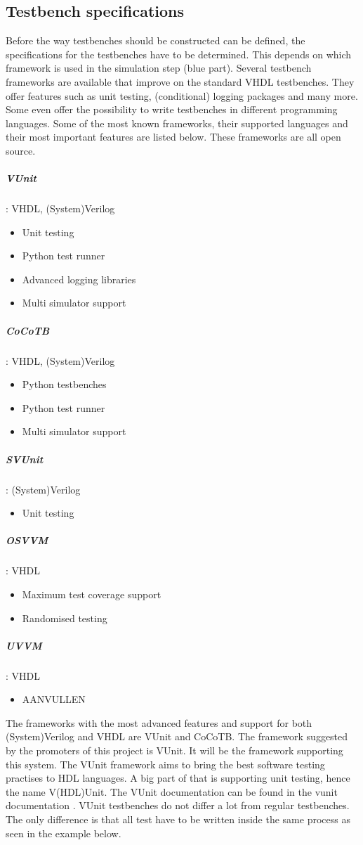 \subsection{Testbench specifications}
Before the way testbenches should be constructed can be defined, the specifications for the testbenches have to be determined. This depends on which framework is used in the simulation step (blue part). Several testbench frameworks are available that improve on the standard VHDL testbenches. They offer features such as unit testing, (conditional) logging packages and many more. Some even offer the possibility to write testbenches in different programming languages.
\npar
Some of the most known frameworks, their supported languages and their most important features are listed below. These frameworks are all open source.
\subparagraph{VUnit}: VHDL, (System)Verilog
\begin{itemize}
	\item Unit testing
	\item Python test runner
	\item Advanced logging libraries
	\item Multi simulator support
\end{itemize}
\subparagraph{CoCoTB}: VHDL, (System)Verilog
\begin{itemize}
	\item Python testbenches
	\item Python test runner
	\item Multi simulator support	
\end{itemize}
\subparagraph{SVUnit}\cite{svunit}: (System)Verilog
\begin{itemize}
	\item Unit testing
\end{itemize}
\subparagraph{OSVVM}\cite{osvvm}: VHDL
\begin{itemize}
	\item Maximum test coverage support
	\item Randomised testing
\end{itemize}
\subparagraph{UVVM}\cite{uvvm}: VHDL
\begin{itemize}
	\item AANVULLEN
\end{itemize}\noindent
The frameworks with the most advanced features and support for both (System)Verilog and VHDL are VUnit and CoCoTB. The framework suggested by the promoters of this project is VUnit. It will be the framework supporting this system.
\npar
The VUnit framework aims to bring the best software testing practises to HDL languages. A big part of that is supporting unit testing, hence the name V(HDL)Unit. The VUnit documentation can be found in the vunit documentation \cite{vunit_doc}. VUnit testbenches do not differ a lot from regular testbenches. The only difference is that all test have to be written inside the same process as seen in the example below.
